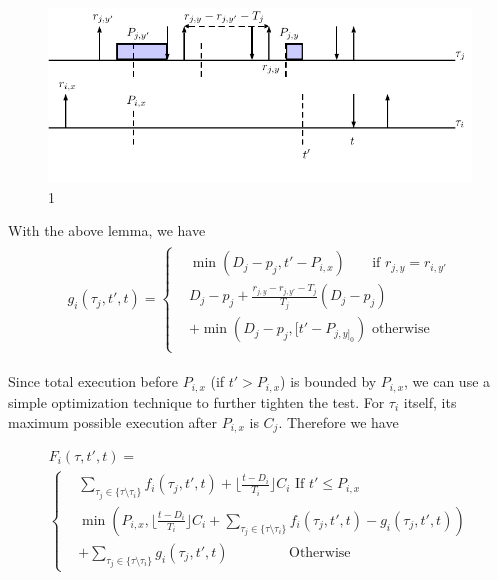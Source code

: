 \begin{figure}[h!]
 \centering
\includegraphics[scale=0.7]{fig/Cy}  
\caption{1}
  \label{fig:o2}
\end{figure}
With the above lemma, we have
	\begin{align*}
	\begin{split}
	g_{i}(\tau_j,t',t)=
	\begin{cases}
	&\min(D_j-p_j, t'-P_{i,x})~\mbox{~~~~~if } r_{j,y}= r_{i,y'}\\
	&D_j-p_j+\frac{r_{j,y}-r_{j,y'}-T_j}{T_j}(D_j-p_j)\\&+\min(D_j-p_j, [t'-P_{j,y]_0})\mbox{~otherwise} \\
	\end{cases}
	\end{split}
	\end{align*}

Since total execution before $P_{i,x}$ (if $t'>P_{i,x}$) is bounded by  $P_{i,x}$, we can use a simple optimization technique to further tighten the test. 	For $\tau_i$ itself,  its maximum possible execution after  $P_{i,x}$ is $C_j$. Therefore we have 

\begin{equation}
\begin{split}
F_i(\tau,t',t)=~~~~~~~~~~~~~~~~~~~~~~~~~~~~~~~~~~~~~~~~~~~~~~\\
\begin{cases}
& \sum\limits_{\tau_j\in\{\tau\setminus\tau_i\}}f_i(\tau_j,t',t)+ \lfloor \frac{t-D_i}{T_i} \rfloor C_i\mbox{~If~} t'\leq P_{i,x}\\
&\min\!\left(P_{i,x},  \lfloor \frac{t-D_i}{T_i} \rfloor C_i\!\!+\!\!\!\!\!\!\!\sum\limits_{\tau_j\in\{\tau\setminus\tau_i\}}\!\!\!\!\!\!f_i(\tau_j,t',t)\!-\!g_{i}(\tau_j,t',t)\!\right)\\&+\sum_{\tau_j\in\{\tau\setminus\tau_i\}}g_{i}(\tau_j,t',t)\mbox{~~~~~~~~~~~~~Otherwise}
\end{cases}	
\end{split}
\end{equation}





